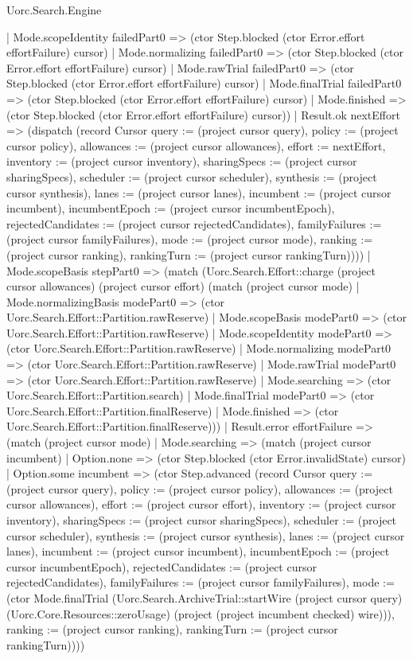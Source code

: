 \begin{lexlean}{Uorc.Search.Engine}
\begin{semanticmodule}
{        | Mode.scopeIdentity failedPart0 => (ctor Step.blocked (ctor Error.effort effortFailure) cursor)
        | Mode.normalizing failedPart0 => (ctor Step.blocked (ctor Error.effort effortFailure) cursor)
        | Mode.rawTrial failedPart0 => (ctor Step.blocked (ctor Error.effort effortFailure) cursor)
        | Mode.finalTrial failedPart0 => (ctor Step.blocked (ctor Error.effort effortFailure) cursor)
        | Mode.finished => (ctor Step.blocked (ctor Error.effort effortFailure) cursor))
      | Result.ok nextEffort => (dispatch (record Cursor {query := (project cursor query), policy := (project cursor policy), allowances := (project cursor allowances), effort := nextEffort, inventory := (project cursor inventory), sharingSpecs := (project cursor sharingSpecs), scheduler := (project cursor scheduler), synthesis := (project cursor synthesis), lanes := (project cursor lanes), incumbent := (project cursor incumbent), incumbentEpoch := (project cursor incumbentEpoch), rejectedCandidates := (project cursor rejectedCandidates), familyFailures := (project cursor familyFailures), mode := (project cursor mode), ranking := (project cursor ranking), rankingTurn := (project cursor rankingTurn)})))
    | Mode.scopeBasis stepPart0 => (match (Uorc.Search.Effort::charge (project cursor allowances) (project cursor effort) (match (project cursor mode)
        | Mode.normalizingBasis modePart0 => (ctor Uorc.Search.Effort::Partition.rawReserve)
        | Mode.scopeBasis modePart0 => (ctor Uorc.Search.Effort::Partition.rawReserve)
        | Mode.scopeIdentity modePart0 => (ctor Uorc.Search.Effort::Partition.rawReserve)
        | Mode.normalizing modePart0 => (ctor Uorc.Search.Effort::Partition.rawReserve)
        | Mode.rawTrial modePart0 => (ctor Uorc.Search.Effort::Partition.rawReserve)
        | Mode.searching => (ctor Uorc.Search.Effort::Partition.search)
        | Mode.finalTrial modePart0 => (ctor Uorc.Search.Effort::Partition.finalReserve)
        | Mode.finished => (ctor Uorc.Search.Effort::Partition.finalReserve)))
      | Result.error effortFailure => (match (project cursor mode)
        | Mode.searching => (match (project cursor incumbent)
          | Option.none => (ctor Step.blocked (ctor Error.invalidState) cursor)
          | Option.some incumbent => (ctor Step.advanced (record Cursor {query := (project cursor query), policy := (project cursor policy), allowances := (project cursor allowances), effort := (project cursor effort), inventory := (project cursor inventory), sharingSpecs := (project cursor sharingSpecs), scheduler := (project cursor scheduler), synthesis := (project cursor synthesis), lanes := (project cursor lanes), incumbent := (project cursor incumbent), incumbentEpoch := (project cursor incumbentEpoch), rejectedCandidates := (project cursor rejectedCandidates), familyFailures := (project cursor familyFailures), mode := (ctor Mode.finalTrial (Uorc.Search.ArchiveTrial::startWire (project cursor query) (Uorc.Core.Resources::zeroUsage) (project (project incumbent checked) wire))), ranking := (project cursor ranking), rankingTurn := (project cursor rankingTurn)})))
}
\end{semanticmodule}
\end{lexlean}
